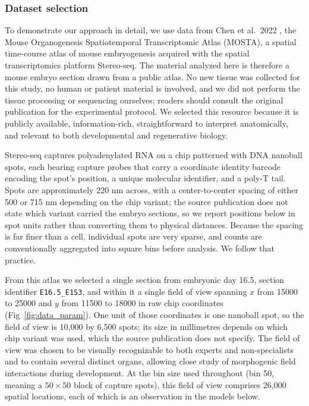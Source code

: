 \documentclass[10pt,letterpaper]{article}
\begin{document}
\subsubsection*{Dataset selection}
To demonstrate our approach in detail, we use data from Chen et al.\ 2022 \cite{Chen2022}, the Mouse Organogenesis Spatiotemporal Transcriptomic Atlas (MOSTA), a spatial time-course atlas of mouse embryogenesis acquired with the spatial transcriptomics platform Stereo-seq. The material analyzed here is therefore a mouse embryo section drawn from a public atlas. No new tissue was collected for this study, no human or patient material is involved, and we did not perform the tissue processing or sequencing ourselves; readers should consult the original publication for the experimental protocol. We selected this resource because it is publicly available, information-rich, straightforward to interpret anatomically, and relevant to both developmental and regenerative biology.

Stereo-seq captures polyadenylated RNA on a chip patterned with DNA nanoball spots, each bearing capture probes that carry a coordinate identity barcode encoding the spot's position, a unique molecular identifier, and a poly-T tail. Spots are approximately 220 nm across, with a center-to-center spacing of either 500 or 715 nm depending on the chip variant; the source publication does not state which variant carried the embryo sections, so we report positions below in spot units rather than converting them to physical distances. Because the spacing is far finer than a cell, individual spots are very sparse, and counts are conventionally aggregated into square bins before analysis. We follow that practice.

From this atlas we selected a single section from embryonic day 16.5, section identifier \texttt{E16.5\_E1S3}, and within it a single field of view spanning $x$ from 15000 to 25000 and $y$ from 11500 to 18000 in raw chip coordinates (Fig~\ref{fig:data_param}). One unit of those coordinates is one nanoball spot, so the field of view is 10,000 by 6,500 spots; its size in millimetres depends on which chip variant was used, which the source publication does not specify. The field of view was chosen to be visually recognizable to both experts and non-specialists and to contain several distinct organs, allowing close study of morphogenic field interactions during development. At the bin size used throughout (bin 50, meaning a $50\times50$ block of capture spots), this field of view comprises 26,000 spatial locations, each of which is an observation in the models below.
\end{document}

